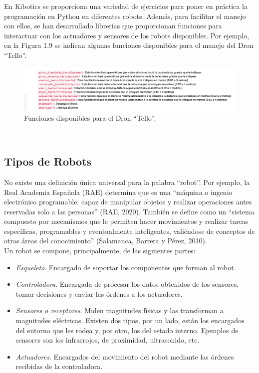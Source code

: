 \documentclass{report}
\begin{document}
En Kibotics se proporciona una variedad de ejercicios para poner en práctica la programación en Python en diferentes robots. Además, para facilitar el manejo con ellos, se han desarrollado librerías que proporcionan funciones para interactuar con los actuadores y sensores de los robots disponibles. Por ejemplo, en la Figura 1.9 se indican algunas funciones disponibles para el manejo del Dron “Tello”.
\\
\begin{figure}[h!]
  \centering
    \includegraphics[width=1.1\textwidth]{images/api.png}
  \caption{Funciones disponibles para el Dron “Tello”.}
  \label{Funciones disponibles para el Dron “Tello”.}
\end{figure}
\\

\subsection{Tipos de Robots}

No existe una definición única universal para la palabra “robot”. Por ejemplo, la Real Academia Española (RAE) determina que es una “máquina o ingenio electrónico programable, capaz de manipular objetos y realizar operaciones antes reservadas solo a las personas” (RAE, 2020). También se define como un “sistema compuesto por mecanismos que le permiten hacer movimientos y realizar tareas específicas, programables y eventualmente inteligentes, valiéndose de conceptos de otras áreas del conocimiento” (Salamanca, Barrera y Pérez, 2010).
\\

Un robot se compone, principalmente, de las siguientes partes:
\begin{itemize}
	\item \textit{Esqueleto}. Encargado de soportar los componentes que forman al robot.

	\item \textit{Controladora}. Encargada de procesar los datos obtenidos de los sensores, tomar decisiones y enviar las órdenes a los actuadores.
		
	\item \textit{Sensores o receptores}. Miden magnitudes físicas y las transforman a magnitudes eléctricas. Existen dos tipos, por un lado, están los encargados del entorno que les rodea y, por otro, los del estado interno. Ejemplos de sensores son los infrarrojos, de proximidad, ultrasonido, etc.
	
	\item \textit{Actuadores}. Encargados del movimiento del robot mediante las órdenes recibidas de la controladora.
\end{itemize}
\end{document}
